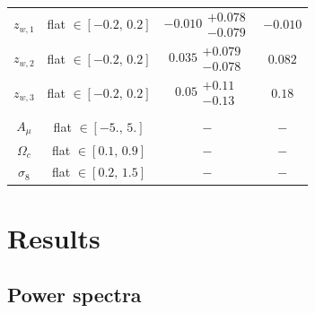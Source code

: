 \documentclass[a4paper,11pt]{article}
\begin{document}
\begin{table}
\begin{center}
\begin{tabular}{cccc}
          $z_{w, 1}$ & flat $\in [-0.2, \,0.2]$ & $-0.010\substack{+0.078 \\ -0.079}$ & $-0.010$ \\
          $z_{w, 2}$ & flat $\in [-0.2, \,0.2]$ & $0.035\substack{+0.079 \\ -0.078}$ & $0.082$ \\
          $z_{w, 3}$ & flat $\in [-0.2, \,0.2]$ & $0.05\substack{+0.11 \\ -0.13}$ & $0.18$ \\ \\
          $A_{\mu}$ & flat $\in [-5., \,5.]$ & $ - $ & $ - $ \\
          $\Omega_{c}$ & flat $\in [0.1, \,0.9]$ & $ - $ & $ - $ \\
          $\sigma_{8}$ & flat $\in [0.2, \,1.5]$ & $ - $ & $ - $ \\
          \hline\hline 
        \end{tabular}
      \end{center}
    \end{table} 

\section{Results}\label{sec:results}
  \subsection{Power spectra}\label{ssec:results.spectra}
\end{document}
